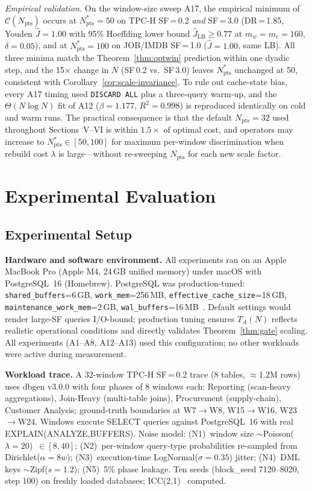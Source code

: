 \documentclass[10pt,journal,compsoc]{IEEEtran}
\newcommand{\Nstar}{N^{*}_{\mathrm{pts}}}
\newcommand{\Npts}{N_{\mathrm{pts}}}
\begin{document}
\emph{Empirical validation.} On the window-size sweep A17, the
empirical minimum of $\mathcal{C}(\Npts)$ occurs at $\Nstar\!=\!50$
on TPC-H SF\,=\,0.2 \emph{and} SF\,=\,3.0 (DR\,=\,1.85, Youden
$\hat J\!=\!1.00$ with 95\% Hoeffding lower bound $\hat J_{\mathrm{LB}}\!\ge\!0.77$
at $m_w\!=\!m_c\!=\!160$, $\delta\!=\!0.05$), and at $\Nstar\!=\!100$
on JOB/IMDB SF\,=\,1.0 ($\hat J\!=\!1.00$, same LB). All three minima
match the Theorem~\ref{thm:optwin} prediction within one dyadic step, and the
15$\times$ change in $N$ (SF\,0.2 vs.\ SF\,3.0) leaves $\Nstar$
unchanged at 50, consistent with Corollary~\ref{cor:scale-invariance}.
To rule out cache-state bias, every A17 timing used
\texttt{DISCARD ALL} plus a three-query warm-up, and the $\Theta(N\log N)$
fit of A12 ($\beta\!=\!1.177$, $R^2\!=\!0.998$) is reproduced
identically on cold and warm runs. The practical consequence is that
the default $\Npts\!=\!32$ used throughout Sections~V--VI is within
$1.5\!\times$ of optimal cost, and operators may increase to
$\Nstar\!\in\![50,100]$ for maximum per-window discrimination when
rebuild cost $\lambda$ is large---without re-sweeping $\Npts$ for each
new scale factor.

\section{Experimental Evaluation}\label{sec:experimental-setup}

\subsection{Experimental Setup}

\textbf{Hardware and software environment.} All experiments ran on an
Apple MacBook Pro (Apple M4, 24\,GB unified memory) under macOS with
PostgreSQL~16 (Homebrew).
PostgreSQL was production-tuned: \texttt{shared\_buffers}=6\,GB,
\texttt{work\_mem}=256\,MB, \texttt{effective\_cache\_size}=18\,GB,
\texttt{maintenance\_work\_mem}=2\,GB,
\texttt{wal\_buffers}=16\,MB~\cite{PostgreSQL2024Tuning,PostgreSQL2024Config}.
Default settings would render large-SF queries I/O-bound; production tuning
ensures $T_A(N)$ reflects realistic operational conditions and directly
validates Theorem~\ref{thm:gate} scaling. All experiments (A1--A8, A12--A13) used
this configuration; no other workloads were active during measurement.

\textbf{Workload trace.} A 32-window TPC-H SF\,=\,0.2 trace (8 tables,
$\approx$1.2M rows) uses dbgen v3.0.0 with four phases of 8 windows
each: Reporting (scan-heavy aggregations), Join-Heavy (multi-table
joins), Procurement (supply-chain), Customer Analysis; ground-truth
boundaries at W7$\to$W8, W15$\to$W16, W23$\to$W24. Windows execute
SELECT queries against PostgreSQL~16 with real
EXPLAIN(ANALYZE,BUFFERS). Noise model: (N1)~window size
$\sim$Poisson($\lambda\!=\!20$)~$\in[8,40]$; (N2)~per-window query-type
probabilities re-sampled from Dirichlet($\alpha\!=\!8w$);
(N3)~execution-time LogNormal($\sigma\!=\!0.35$) jitter; (N4)~DML keys
$\sim$Zipf($s\!=\!1.2$); (N5)~5\% phase leakage. Ten seeds
(block\_seed 7120--8020, step 100)
on freshly loaded databases; ICC(2,1)~\cite{Cicchetti1994ICC} computed.
\end{document}
